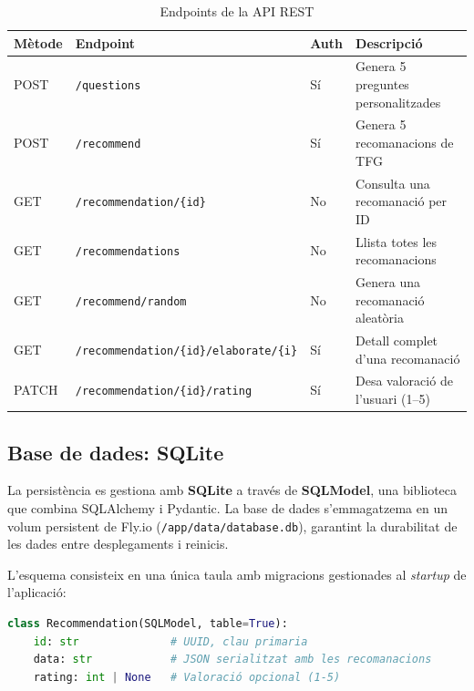 \documentclass[12pt,a4paper]{article}
\begin{document}
\begin{table}[H]
\centering
\renewcommand{\arraystretch}{1.3}
\begin{tabular}{llll}
\toprule
\textbf{Mètode} & \textbf{Endpoint} & \textbf{Auth} & \textbf{Descripció} \\
\midrule
POST   & \texttt{/questions}                              & Sí & Genera 5 preguntes personalitzades \\
POST   & \texttt{/recommend}                              & Sí & Genera 5 recomanacions de TFG \\
GET    & \texttt{/recommendation/\{id\}}                  & No & Consulta una recomanació per ID \\
GET    & \texttt{/recommendations}                        & No & Llista totes les recomanacions \\
GET    & \texttt{/recommend/random}                       & No & Genera una recomanació aleatòria \\
GET    & \texttt{/recommendation/\{id\}/elaborate/\{i\}}  & Sí & Detall complet d'una recomanació \\
PATCH  & \texttt{/recommendation/\{id\}/rating}           & Sí & Desa valoració de l'usuari (1--5) \\
\bottomrule
\end{tabular}
\caption{Endpoints de la API REST}
\label{tab:endpoints}
\end{table}

\subsection{Base de dades: SQLite}

La persistència es gestiona amb \textbf{SQLite} a través de \textbf{SQLModel}, una biblioteca que combina SQLAlchemy i Pydantic. La base de dades s'emmagatzema en un volum persistent de Fly.io (\texttt{/app/data/database.db}), garantint la durabilitat de les dades entre desplegaments i reinicis.

L'esquema consisteix en una única taula amb migracions gestionades al \textit{startup} de l'aplicació:

\begin{lstlisting}[language=Python, caption=Model de dades (SQLModel)]
class Recommendation(SQLModel, table=True):
    id: str              # UUID, clau primaria
    data: str            # JSON serialitzat amb les recomanacions
    rating: int | None   # Valoració opcional (1-5)
\end{lstlisting}
\end{document}
